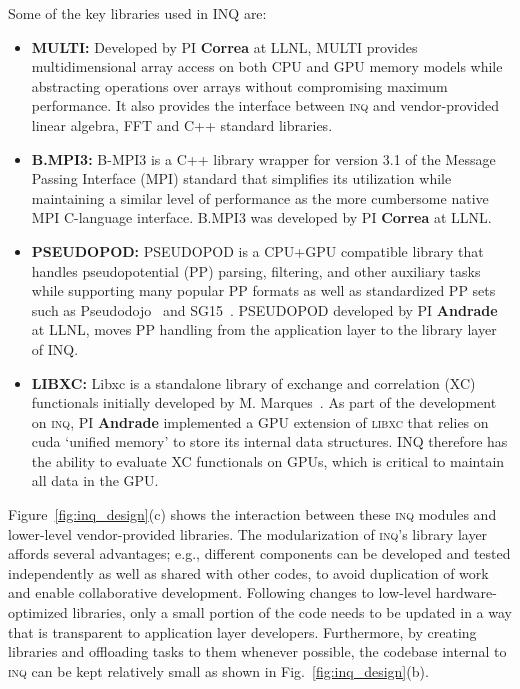 Some of the key libraries used in INQ are:
\begin{itemize}
	\item \textbf{MULTI:} Developed by PI \textbf{Correa} at LLNL, \textsc{MULTI} provides multidimensional array access on both CPU and GPU memory models while abstracting operations over arrays without compromising maximum performance. 
	It also provides the interface between \textsc{inq} and vendor-provided linear algebra, FFT and C++ standard libraries.
	\item \textbf{B.MPI3:} B-MPI3 is a C++ library wrapper for version 3.1 of the Message Passing Interface (MPI) standard that simplifies its utilization while maintaining a similar level of performance as the more cumbersome native MPI C-language interface. 
	B.MPI3 was developed by PI \textbf{Correa} at LLNL.
	\item \textbf{PSEUDOPOD:} \textsc{PSEUDOPOD} is a CPU+GPU compatible library that handles pseudopotential (PP) parsing, filtering, and other auxiliary tasks while supporting many popular PP formats as well as standardized PP sets such as Pseudodojo~\cite{Van2018} and SG15~\cite{Schlipf2015}. 
	\textsc{PSEUDOPOD} developed by PI \textbf{Andrade} at LLNL, moves PP handling from the application layer to the library layer of INQ.
	\item \textbf{LIBXC:} Libxc is a standalone library of exchange and correlation (XC) functionals initially developed by M. Marques~\cite{Marques2012}. 
	As part of the development on \textsc{inq}, PI \textbf{Andrade} implemented a GPU extension of \textsc{libxc} that relies on cuda ‘unified memory’ to store its internal data structures. 
	\textsc{INQ} therefore has the ability to evaluate XC functionals on GPUs, which is critical to maintain all data in the GPU.
\end{itemize}

Figure~\ref{fig:inq_design}(c) shows the interaction between these \textsc{inq} modules and lower-level vendor-provided libraries. 
The modularization of \textsc{inq}'s library layer affords several advantages; e.g., different components can be developed and tested independently as well as shared with other codes, to avoid duplication of work and enable collaborative development. 
Following changes to low-level hardware-optimized libraries, only a small portion of the code needs to be updated in a way that is transparent to application layer developers. 
Furthermore, by creating libraries and offloading tasks to them whenever possible, the codebase internal to \textsc{inq} can be kept relatively small as shown in Fig.~\ref{fig:inq_design}(b). 

